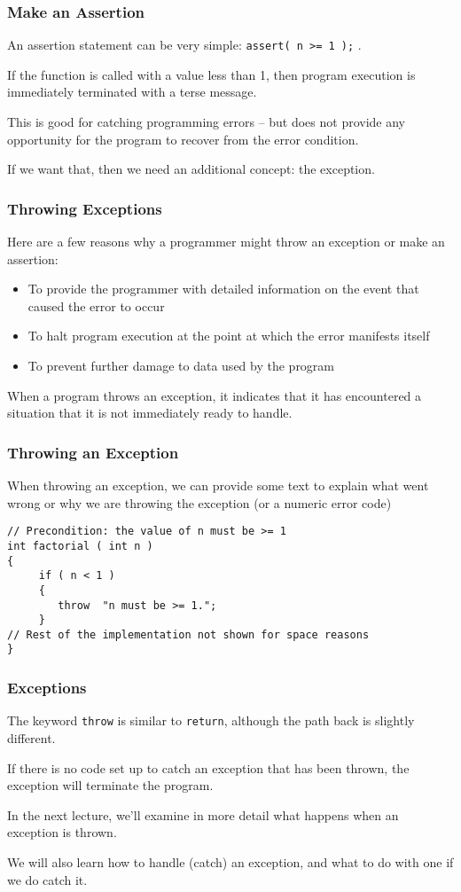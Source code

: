 \begin{frame}
\frametitle{Make an Assertion}
An assertion statement can be very simple: \texttt{assert( n >= 1 );} .

If the function is called with a value less than 1, then program execution is immediately terminated with a terse message.

This is good for catching programming errors -- but does not provide any opportunity for the program to recover from the error condition.

If we want that, then we need an additional concept: the \alert{exception}.


\end{frame}


\begin{frame}
\frametitle{Throwing Exceptions}

Here are a few reasons why a programmer might throw an exception or make an assertion:

\begin{itemize}
	\item To provide the programmer with detailed information on the event that caused the error to occur
	\item To halt program execution at the point at which the error manifests itself
	\item To prevent further damage to data used by the program
\end{itemize}

When a program throws an exception, it indicates that it has encountered a situation that it is not immediately ready to handle.

\end{frame}

\begin{frame}[fragile]
\frametitle{Throwing an Exception}

When throwing an exception, we can provide some text to explain what went wrong or why we are throwing the exception (or a numeric error code)

\begin{verbatim}
// Precondition: the value of n must be >= 1
int factorial ( int n )
{
     if ( n < 1 )
     {
        throw  "n must be >= 1.";
     }
// Rest of the implementation not shown for space reasons
}
\end{verbatim}


\end{frame}

\begin{frame}
\frametitle{Exceptions}

The keyword \texttt{throw} is similar to \texttt{return}, although the path back is slightly different.

If there is no code set up to \alert{catch} an exception that has been thrown, the exception will terminate the program.

In the next lecture, we'll examine in more detail what happens when an exception is thrown.

We will also learn how to handle (catch) an exception, and what to do with one if we do catch it.


\end{frame}



